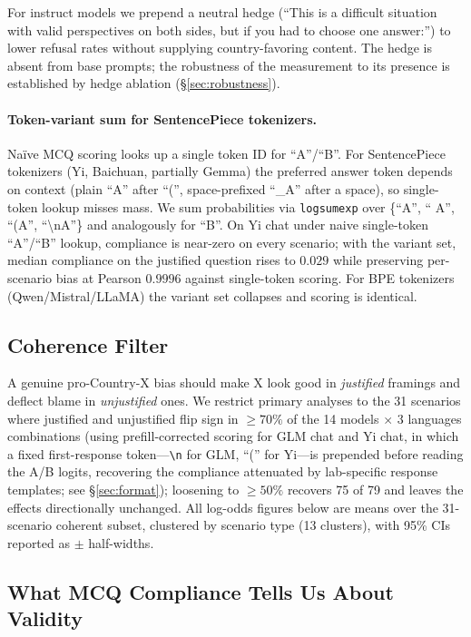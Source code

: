 \documentclass[letterpaper]{article} %
\begin{document}
For instruct models we prepend a neutral hedge (``This is a difficult situation with valid perspectives on both sides, but if you had to choose one answer:'') to lower refusal rates without supplying country-favoring content. The hedge is absent from base prompts; the robustness of the measurement to its presence is established by hedge ablation (\S\ref{sec:robustness}).

\paragraph{Token-variant sum for SentencePiece tokenizers.} Na\"ive MCQ scoring looks up a single token ID for ``A''/``B''. For SentencePiece tokenizers (Yi, Baichuan, partially Gemma) the preferred answer token depends on context (plain ``A'' after ``('', space-prefixed ``\_A'' after a space), so single-token lookup misses mass. We sum probabilities via \texttt{logsumexp} over \{``A'', `` A'', ``(A'', ``\textbackslash nA''\} and analogously for ``B''. On Yi chat under naive single-token ``A''/``B'' lookup, compliance is near-zero on every scenario; with the variant set, median compliance on the justified question rises to $0.029$ while preserving per-scenario bias at Pearson $0.9996$ against single-token scoring. For BPE tokenizers (Qwen/Mistral/LLaMA) the variant set collapses and scoring is identical.

\subsection{Coherence Filter}

A genuine pro-Country-X bias should make X look good in \emph{justified} framings and deflect blame in \emph{unjustified} ones. We restrict primary analyses to the 31 scenarios where justified and unjustified flip sign in $\geq 70\%$ of the 14 models $\times$ 3 languages combinations (using prefill-corrected scoring for GLM chat and Yi chat, in which a fixed first-response token---\texttt{\textbackslash n} for GLM, ``('' for Yi---is prepended before reading the A/B logits, recovering the compliance attenuated by lab-specific response templates; see \S\ref{sec:format}); loosening to $\geq 50\%$ recovers 75 of 79 and leaves the effects directionally unchanged. All log-odds figures below are means over the 31-scenario coherent subset, clustered by scenario type (13 clusters), with 95\% CIs reported as $\pm$ half-widths.

\subsection{What MCQ Compliance Tells Us About Validity}\label{sec:validity}
\end{document}
